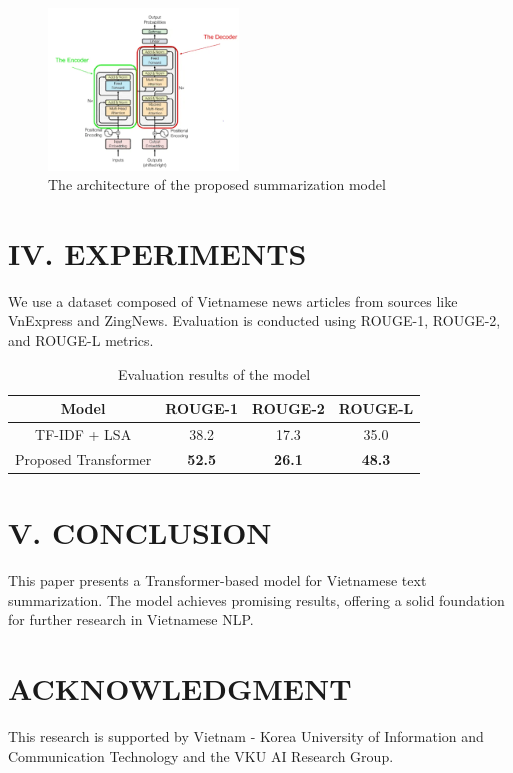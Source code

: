 \documentclass[10pt,twocolumn]{article}
\begin{document}
\begin{figure}[H]
\centering
\includegraphics[width=0.45\textwidth]{img/imagesAttention.png}
\caption{The architecture of the proposed summarization model}
\end{figure}

\vspace{1em}
\section*{IV. EXPERIMENTS}
We use a dataset composed of Vietnamese news articles from sources like VnExpress and ZingNews. Evaluation is conducted using ROUGE-1, ROUGE-2, and ROUGE-L metrics.

\begin{table}[H]
\centering
\caption{Evaluation results of the model}
\begin{tabular}{|c|c|c|c|}
\hline
\textbf{Model} & \textbf{ROUGE-1} & \textbf{ROUGE-2} & \textbf{ROUGE-L} \\
\hline
TF-IDF + LSA & 38.2 & 17.3 & 35.0 \\
Proposed Transformer & \textbf{52.5} & \textbf{26.1} & \textbf{48.3} \\
\hline
\end{tabular}
\end{table}

\vspace{1em}
\section*{V. CONCLUSION}
This paper presents a Transformer-based model for Vietnamese text summarization. The model achieves promising results, offering a solid foundation for further research in Vietnamese NLP.

\vspace{1em}
\section*{ACKNOWLEDGMENT}
This research is supported by Vietnam - Korea University of Information and Communication Technology and the VKU AI Research Group.
\end{document}
